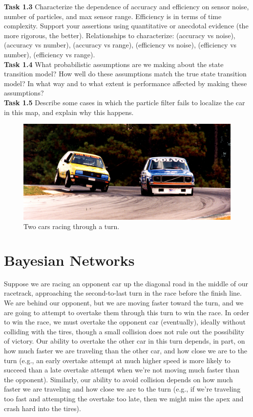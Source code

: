 \documentclass[a4paper]{article}
\begin{document}
\noindent
\textbf{Task 1.3} Characterize the dependence of accuracy and efficiency on sensor noise, number of particles, and max sensor range. Efficiency is in terms of time complexity. Support your assertions using quantitative or anecdotal evidence (the more rigorous, the better). Relationships to characterize: (accuracy vs noise), (accuracy vs number), (accuracy vs range), (efficiency vs noise), (efficiency vs number), (efficiency vs range).\\

\noindent
\textbf{Task 1.4} What probabilistic assumptions are we making about the state transition model? How well do these assumptions match the true state transition model? In what way and to what extent is performance affected by making these assumptions?\\

\noindent
\textbf{Task 1.5} Describe some cases in which the particle filter fails to localize the car in this map, and explain why this happens.\\

\begin{figure}[b!]
    \centering
    \includegraphics[scale=0.4]{images/overtake.jpg}
    \caption{Two cars racing through a turn.}
    \label{fig:overtake}
\end{figure}

\section{Bayesian Networks}

Suppose we are racing an opponent car up the diagonal road in the middle of our racetrack, approaching the second-to-last turn in the race before the finish line. We are behind our opponent, but we are moving faster toward the turn, and we are going to attempt to overtake them through this turn to win the race. In order to win the race, we must overtake the opponent car (eventually), ideally without colliding with the tires, though a small collision does not rule out the possibility of victory. Our ability to overtake the other car in this turn depends, in part, on how much faster we are traveling than the other car, and how close we are to the turn (e.g., an early overtake attempt at much higher speed is more likely to succeed than a late overtake attempt when we're not moving much faster than the opponent). Similarly, our ability to avoid collision depends on how much faster we are traveling and how close we are to the turn (e.g., if we're traveling too fast and attempting the overtake too late, then we might miss the apex and crash hard into the tires).\\
\end{document}
